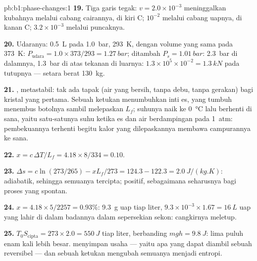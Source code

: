 \begin{solution}{pb:b1:phase-changes:1}
\textbf{19.} Tiga garis tegak: $v = 2.0 \times 10^{-3}$ meninggalkan kubahnya
melalui cabang cairannya, di kiri C; $10^{-2}$ melalui cabang uapnya,
di kanan C; $3.2 \times 10^{-3}$ melalui puncaknya.

\textbf{20.} Udaranya: \qty{0.5}{L} pada \qty{1.0}{bar}, \qty{293}{K}, dengan volume yang sama pada
\qty{373}{K}: $P_{\text{udara}} = 1.0 \times 373/293 = \qty{1.27}{bar}$; ditambah
$P_s = \qty{1.01}{bar}$: \qty{2.3}{bar} di dalamnya, \qty{1.3}{bar} di atas tekanan
di luarnya: $1.3 \times 10^5 \times 10^{-2} = \qty{1.3}{kN}$ pada tutupnya --- setara
berat \qty{130}{kg}.

\textbf{21.} , metastabil: tak ada tapak  (air yang bersih,
tanpa debu, tanpa gerakan) bagi kristal yang pertama. Sebuah ketukan menumbuhkan inti es, yang
tumbuh menembus botolnya sambil melepaskan $L_f$; suhunya naik ke
\qty{0}{\degreeCelsius} lalu berhenti di sana, yaitu satu-satunya suhu ketika es
dan air berdampingan pada \qty{1}{atm}: pembekuannya terhenti begitu
kalor yang dilepaskannya membawa campurannya ke sana.

\textbf{22.} $x = c\,\Delta T/L_f = 4.18 \times 8/334 = 0.10$.

\textbf{23.} $\Delta s = c\ln(273/265) - xL_f/273 = 124.3 - 122.3 =
\qty{+2.0}{J/(kg.K)}$: adiabatik, sehingga semuanya tercipta; positif, sebagaimana
seharusnya bagi proses yang spontan.

\textbf{24.} $x = 4.18 \times 5/2257 = 0.93\%$: \qty{9.3}{g} uap tiap liter,
$9.3 \times 10^{-3} \times 1.67 = \qty{16}{L}$ uap yang lahir di dalam badannya dalam
sepersekian sekon: cangkirnya meletup.

\textbf{25.} $T_0S_{\mathrm{cipta}} = 273 \times 2.0 = \qty{550}{J}$ tiap liter,
berbanding $mgh = \qty{9.8}{J}$: lima puluh enam kali lebih besar. 
menyimpan usaha --- yaitu apa yang dapat diambil sebuah  reversibel --- dan sebuah
ketukan mengubah semuanya menjadi entropi.
\end{solution}
